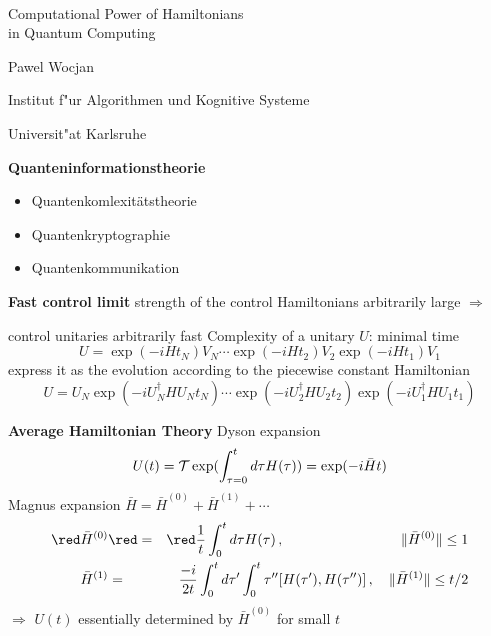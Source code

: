 \documentclass[portrait]{seminar}
\begin{document}
\begin{slide}
{$ $}
\vfill
\begin{center}
{\Large \blue Computational Power of Hamiltonians\\ in Quantum Computing} 

\vfill Pawel Wocjan

{\small Institut f"ur Algorithmen und Kognitive Systeme}

{\small Universit"at Karlsruhe}
\end{center}
\vfill
\end{slide}

\begin{slide}
{\large {\bf Quanteninformationstheorie}}
\vfill
\begin{itemize}
\item Quantenkomlexit\"atstheorie
\item Quantenkryptographie
\item Quantenkommunikation
\end{itemize}
\vfill
\end{slide}

\begin{slide}
{\large {\bf Fast control limit}}
\vfill
strength of the control Hamiltonians arbitrarily large $\Longrightarrow$

{\blue control unitaries} arbitrarily fast
\vfill
{\red Complexity of a unitary $U$}: minimal time
\[
U=\exp(-i H t_N) V_N \cdots \exp(-i H t_2) V_2 \exp(-i H t_1) V_1
\]
\vfill
express it as the evolution according to the piecewise constant Hamiltonian
\[
U = U_N \exp(-i U_N^\dagger H U_N t_N) \cdots \exp(-i U_2^\dagger H U_2 t_2)
    \exp(-i U_1^\dagger H U_1 t_1)
\]
\vfill
\end{slide}


\begin{slide}
{\large {\bf Average Hamiltonian Theory}}
\vfill
{\blue Dyson expansion}
\[
U(t)={\cal T} \exp(\int_{\tau=0}^t d\tau H(\tau))=\exp(-i\bar{H}t)
\]
\vfill
{\blue Magnus expansion} $\bar{H}=\bar{H}^{(0)}+\bar{H}^{(1)}+\cdots$
\begin{eqnarray*}
{\red\bar{H}^{(0)}} & {\red =} & {\red \frac{1}{t}\int_0^t d\tau
H(\tau)\,,\quad\quad\quad\quad\ \quad\quad\quad\quad
\|\bar{H}^{(0)}\|\le 1} \\
\bar{H}^{(1)} & = & \frac{-i}{2t}\int_0^t
d\tau' \int_0^t\tau'' [H(\tau'),H(\tau'')]\,,\quad
\|\bar{H}^{(1)}\|\le t/2
\end{eqnarray*}
\vfill
{\red $\Longrightarrow$ $U(t)$ essentially determined by $\bar{H}^{(0)}$ for
small $t$}
\vfill
\end{slide}
\end{document}
